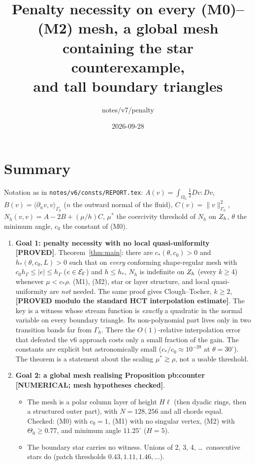 \documentclass[11pt]{article}
\title{Penalty necessity on every (M0)--(M2) mesh, a global mesh containing the star counterexample,\\ and tall boundary triangles}
\date{2026-09-28}\author{notes/v7/penalty}
\theoremstyle{remark}\newtheorem{remark}[theorem]{Remark}
\newcommand{\Oh}{\Omega_h}\newcommand{\Gh}{\Gamma_h}\newcommand{\hG}{h_\Gamma}\newcommand{\dn}{\partial_n}
\newcommand{\norm}[1]{\|#1\|}\newcommand{\ip}[2]{\langle #1,#2\rangle}\DeclareMathOperator{\curl}{curl}\DeclareMathOperator{\diam}{diam}
\newcommand{\lab}[1]{\textbf{[#1]}}
\begin{document}
\maketitle

\section*{Summary}
Notation as in \texttt{notes/v6/consts/REPORT.tex}: $A(v)=\int_{\Oh}\frac12Dv:Dv$, $B(v)=\ip{\dn v}{v}_{\Gh}$ ($n$ the outward
normal of the fluid), $C(v)=\norm v^2_{\Gh}$, $N_h(v,v)=A-2B+(\mu/h)C$, $\mu^\ast$ the coercivity threshold of $N_h$ on
$Z_h$, $\theta$ the minimum angle, $c_0$ the constant of (M0).
\begin{enumerate}[label=(\arabic*)]
\item \textbf{Goal 1: penalty necessity with no local quasi-uniformity} \lab{PROVED}. Theorem~\ref{thm:main}: there are
  $c_\ast(\theta,c_0)>0$ and $h_\ast(\theta,c_0,L)>0$ such that on \emph{every} conforming shape-regular mesh with
  $c_0\hG\le|e|\le\hG$ ($e\in\mathcal E_\Gamma$) and $h\le h_\ast$, $N_h$ is indefinite on $Z_h$ (every $k\ge4$) whenever
  $\mu<c_\ast\rho$. (M1), (M2), star or layer structure, and local quasi-uniformity are \emph{not} needed. The same proof gives
  Clough--Tocher, $k\ge2$, \lab{PROVED modulo the standard HCT interpolation estimate}.
  The key is a witness whose stream function is \emph{exactly} a quadratic in the normal variable on every boundary
  triangle. Its non-polynomial part lives only in two transition bands far from $\Gh$. There the $O(1)$-relative
  interpolation error that defeated the v6 approach costs only a small fraction of the gain. The constants are explicit but
  astronomically small ($c_\ast/c_0\approx10^{-39}$ at $\theta=30^\circ$). The theorem is a statement about the scaling
  $\mu^\ast\gtrsim\rho$, not a usable threshold.
\item \textbf{Goal 2: a global mesh realising Proposition pb:counter} \lab{NUMERICAL; mesh hypotheses checked}.
  \begin{itemize}
  \item The mesh is a polar column layer of height $H\ell$ (then dyadic rings, then a structured outer part), with $N=128,256$
    and all chords equal. Checked: (M0) with $c_0=1$, (M1) with no singular vertex, (M2) with $\Theta_0\ge0.77$, and minimum
    angle $11.25^\circ$ ($H=5$).
  \item The boundary star carries no witness. Unions of 2, 3, 4, \dots\ consecutive stars do (patch thresholds
    $0.43, 1.11, 1.46,\dots$).

\end{itemize}
\end{enumerate}
\end{document}
